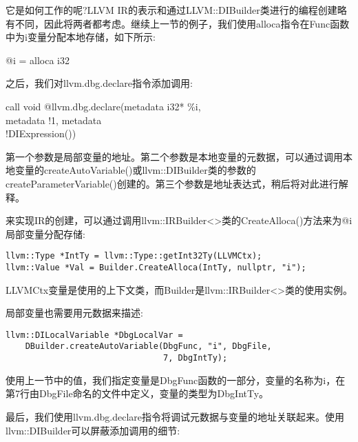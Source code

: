 它是如何工作的呢?LLVM IR的表示和通过LLVM::DIBuilder类进行的编程创建略有不同，因此将两者都考虑。继续上一节的例子，我们使用alloca指令在Func函数中为i变量分配本地存储，如下所示:\par

\begin{tcolorbox}[colback=white,colframe=black]
@i = alloca i32
\end{tcolorbox}

之后，我们对llvm.dbg.declare指令添加调用:\par

\begin{tcolorbox}[colback=white,colframe=black]
call void @llvm.dbg.declare(metadata i32* \%i, \\
\hspace*{3cm}metadata !1, metadata \\
\hspace*{3cm}!DIExpression())
\end{tcolorbox}

第一个参数是局部变量的地址。第二个参数是本地变量的元数据，可以通过调用本地变量的createAutoVariable()或llvm::DIBuilder类的参数的createParameterVariable()创建的。第三个参数是地址表达式，稍后将对此进行解释。\par

来实现IR的创建，可以通过调用llvm::IRBuilder<>类的CreateAlloca()方法来为@i局部变量分配存储:\par

\begin{lstlisting}[caption={}]
llvm::Type *IntTy = llvm::Type::getInt32Ty(LLVMCtx);
llvm::Value *Val = Builder.CreateAlloca(IntTy, nullptr, "i");
\end{lstlisting}

LLVMCtx变量是使用的上下文类，而Builder是llvm::IRBuilder<>类的使用实例。\par

局部变量也需要用元数据来描述:\par

\begin{lstlisting}[caption={}]
llvm::DILocalVariable *DbgLocalVar =
	DBuilder.createAutoVariable(DbgFunc, "i", DbgFile,
								7, DbgIntTy);
\end{lstlisting}

使用上一节中的值，我们指定变量是DbgFunc函数的一部分，变量的名称为i，在第7行由DbgFile命名的文件中定义，变量的类型为DbgIntTy。\par

最后，我们使用llvm.dbg.declare指令将调试元数据与变量的地址关联起来。使用llvm::DIBuilder可以屏蔽添加调用的细节:\par

